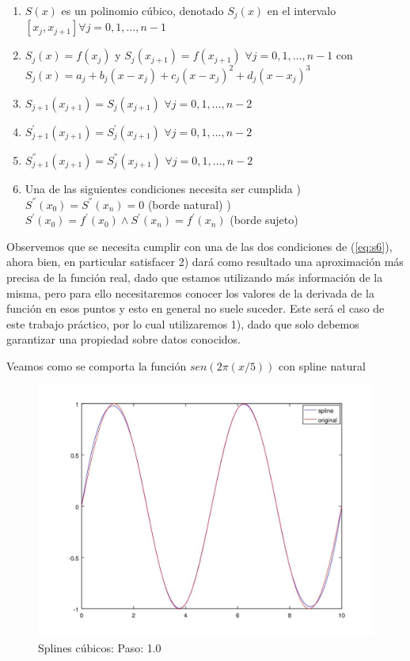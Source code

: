 \begin{enumerate}
\item $S(x)$ es un polinomio cúbico, denotado $S_j(x)$ en el intervalo $[x_j, x_{j+1}] \forall j = 0, 1, \dots, n-1$ \label{eq:s1}
\item $S_j(x) = f(x_j)$ y $S_j(x_{j+1}) = f(x_{j+1})$ $\forall j = 0, 1, \dots, n-1$ con $S_j(x) = a_j + b_j(x - x_j) + c_j(x - x_j)^2 + d_j(x - x_j)^3$ \label{eq:s2}
\item $S_{j+1}(x_{j+1}) = S_j(x_{j+1})$ $\forall j = 0, 1, \dots, n-2$ \label{eq:s3}
\item $S_{j+1}^{'}(x_{j+1}) = S_j^{'}(x_{j+1})$ $\forall j = 0, 1, \dots, n-2$ \label{eq:s4}
\item $S_{j+1}^{''}(x_{j+1}) = S_j^{''}(x_{j+1})$ $\forall j = 0, 1, \dots, n-2$ \label{eq:s5}
\item Una de las siguientes condiciones necesita ser cumplida \label{eq:s6}
) $S^{''}(x_0) = S^{''}(x_n) = 0$ (borde natural) 
) $S^{'}(x_0) =  f^{'}(x_0) \wedge S^{'}(x_n) = f^{'}(x_n)$ (borde sujeto) 
\end{enumerate}

Observemos que se necesita cumplir con una de las dos condiciones de (\ref{eq:s6}), ahora bien, en particular satisfacer 2) dará como resultado una aproximación más precisa de la función real, dado que estamos utilizando más información de la misma, pero para ello necesitaremos conocer los valores de la derivada de la función en esos puntos y esto en general no suele suceder. Este será el caso de este trabajo práctico, por lo cual utilizaremos 1), dado que solo debemos garantizar una propiedad sobre datos conocidos.

Veamos como se comporta la función $sen(2\pi(x/5))$ con spline natural

\pagebreak

\begin{figure}[h]
\centering
  \begin{minipage}[b]{.9\textwidth}
    \includegraphics[width=\textwidth]{complementos/spline_1.jpg}
    \caption{Splines cúbicos: Paso: 1.0}
  \end{minipage}
\end{figure}

